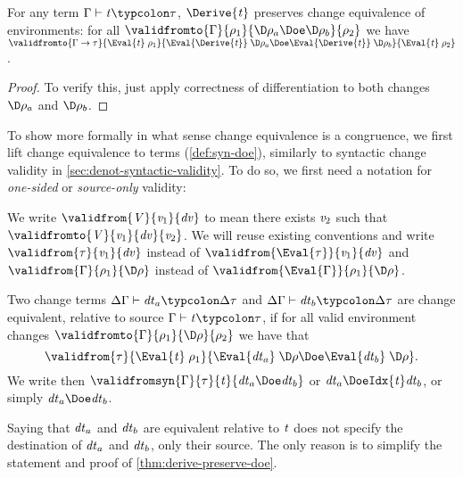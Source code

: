 \begin{lemma}
  \label{lem:eval-derive-preserve-doe}
For any term \ensuremath{\Gamma\vdash\Varid{t}\typcolon\tau}, \ensuremath{\Derive{\Varid{t}}} preserves change
equivalence of environments:
for all \ensuremath{\validfromto{\Gamma}{\rho_{1}}{\D\rho_a\Doe\D\rho_b}{\rho_{2}}} we have
\ensuremath{\validfromto{\Gamma\to \tau}{\Eval{\Varid{t}}\;\rho_{1}}{\Eval{\Derive{\Varid{t}}}\;\D\rho_a\Doe\Eval{\Derive{\Varid{t}}}\;\D\rho_b}{\Eval{\Varid{t}}\;\rho_{2}}}.
\end{lemma}
\begin{proof}
  To verify this, just apply correctness of differentiation to
  both changes \ensuremath{\D\rho_a} and \ensuremath{\D\rho_b}.
\end{proof}

To show more formally in what sense change equivalence is a
congruence, we first lift change equivalence to terms (\cref{def:syn-doe}),
similarly to syntactic change validity in \cref{sec:denot-syntactic-validity}.
To do so, we first need a notation for \emph{one-sided}
or \emph{source-only} validity:
\begin{notation}
  We write \ensuremath{\validfrom{\Conid{V}}{\Varid{v}_{1}}{\Varid{dv}}} to mean there exists \ensuremath{\Varid{v}_{2}} such that
  \ensuremath{\validfromto{\Conid{V}}{\Varid{v}_{1}}{\Varid{dv}}{\Varid{v}_{2}}}. We will reuse existing conventions and
  write \ensuremath{\validfrom{\tau}{\Varid{v}_{1}}{\Varid{dv}}} instead of \ensuremath{\validfrom{\Eval{\tau}}{\Varid{v}_{1}}{\Varid{dv}}}
  and \ensuremath{\validfrom{\Gamma}{\rho_{1}}{\D\rho}} instead of \ensuremath{\validfrom{\Eval{\Gamma}}{\rho_{1}}{\D\rho}}.
\end{notation}

\begin{definition}
  \label{def:syn-doe}
Two change terms \ensuremath{\Delta \Gamma\vdash\Varid{dt}_a\typcolon\Delta \tau} and \ensuremath{\Delta \Gamma\vdash\Varid{dt}_b\typcolon\Delta \tau} are change equivalent, relative to source \ensuremath{\Gamma\vdash\Varid{t}\typcolon\tau}, if for all valid environment changes
\ensuremath{\validfromto{\Gamma}{\rho_{1}}{\D\rho}{\rho_{2}}} we have that
\[\ensuremath{\validfrom{\tau}{\Eval{\Varid{t}}\;\rho_{1}}{\Eval{\Varid{dt}_a}\;\D\rho\Doe\Eval{\Varid{dt}_b}\;\D\rho}}.\]
We write then
\ensuremath{\validfromsyn{\Gamma}{\tau}{\Varid{t}}{\Varid{dt}_a\Doe\Varid{dt}_b}}
or \ensuremath{\Varid{dt}_a\;\negthickspace\DoeIdx{\Varid{t}}\negthickspace\;\Varid{dt}_b}, or simply \ensuremath{\Varid{dt}_a\Doe\Varid{dt}_b}.
\end{definition}
Saying that \ensuremath{\Varid{dt}_a} and \ensuremath{\Varid{dt}_b} are equivalent relative to \ensuremath{\Varid{t}} does
not specify the destination of \ensuremath{\Varid{dt}_a} and \ensuremath{\Varid{dt}_b}, only their
source. The only reason is to simplify the statement and proof of
\cref{thm:derive-preserve-doe}.

